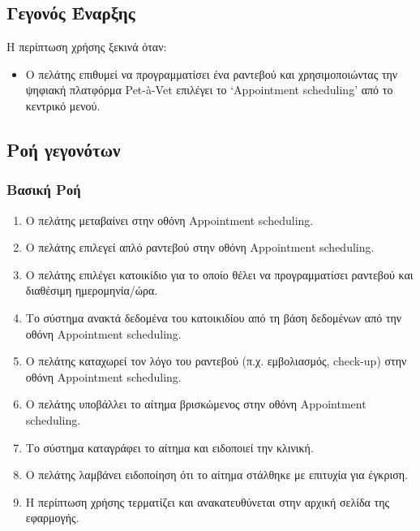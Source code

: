 \documentclass[12pt,a4paper,twoside]{book}
\begin{document}
\subsection{Γεγονός Έναρξης}
Η περίπτωση χρήσης ξεκινά όταν:
\begin{itemize}
  \item Ο πελάτης επιθυμεί να προγραμματίσει ένα ραντεβού και χρησιμοποιώντας την ψηφιακή πλατφόρμα  Pet-à-Vet επιλέγει το ‘Appointment scheduling’ από το κεντρικό μενού. %
\end{itemize}

\subsection{Ροή γεγονότων}

\subsubsection{Βασική Ροή}
\begin{enumerate}
  \item Ο πελάτης μεταβαίνει στην οθόνη Appointment scheduling.
  \item Ο πελάτης επιλεγεί απλό ραντεβού στην οθόνη Appointment scheduling. %
  \item Ο πελάτης επιλέγει κατοικίδιο για το οποίο θέλει να προγραμματίσει ραντεβού και διαθέσιμη ημερομηνία/ώρα. %
  \item Το σύστημα ανακτά δεδομένα του κατοικιδίου από τη βάση δεδομένων από την οθόνη Appointment scheduling. %
  \item Ο πελάτης καταχωρεί τον λόγο του ραντεβού (π.χ. εμβολιασμός, check-up) στην οθόνη Appointment scheduling.  %
  \item Ο πελάτης υποβάλλει το αίτημα βρισκώμενος στην οθόνη Appointment scheduling. %
  \item Το σύστημα καταγράφει το αίτημα και ειδοποιεί την κλινική. %
  \item Ο πελάτης λαμβάνει ειδοποίηση ότι το αίτημα στάλθηκε με επιτυχία για έγκριση. %
  \item Η περίπτωση χρήσης τερματίζει και ανακατευθύνεται στην αρχική σελίδα της εφαρμογής. %
\end{enumerate}
\end{document}
